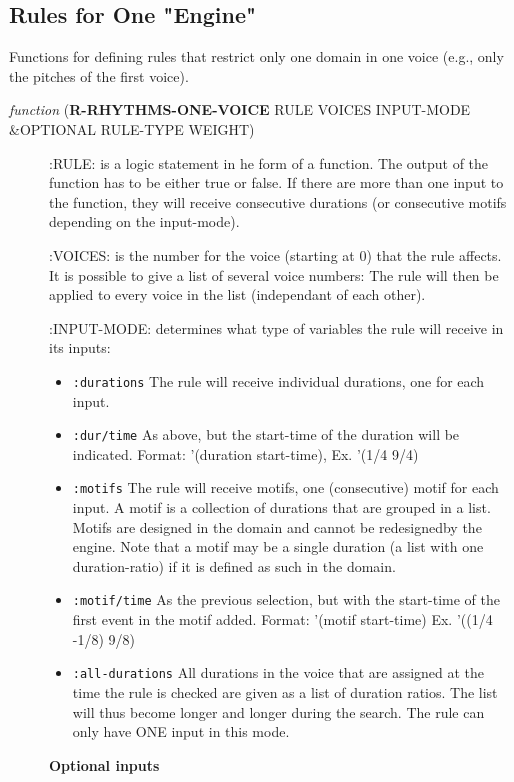 \subsection*{Rules for One "Engine"}
\label{sec:org563702e}

Functions for defining rules that restrict only one domain in one voice (e.g., only the pitches of the first voice). 


\begin{description}
\item[{ \emph{function} (\textbf{R-RHYTHMS-ONE-VOICE} RULE VOICES INPUT-MODE \&OPTIONAL RULE-TYPE WEIGHT)}] :RULE: is a logic statement in he form of a function. The output of the function has to be either true or false. If there are more than one input to the function, they will receive consecutive durations (or consecutive motifs depending on the input-mode). 

:VOICES: is the number for the voice (starting at 0) that the rule affects. It is possible to give a list of several voice numbers: The rule will then be applied to every voice in the list (independant of each other).

:INPUT-MODE: determines what type of variables the rule will receive in its inputs:
\begin{itemize}
\item \texttt{:durations} The rule will receive individual durations, one for each input.
\item \texttt{:dur/time} As above, but the start-time of the duration will be indicated.
Format: '(duration start-time), Ex. '(1/4 9/4)
\item \texttt{:motifs} The rule will receive motifs, one (consecutive) motif for each 
input. A motif is a collection of durations that are grouped in 
a list. Motifs are designed in the domain and cannot be 
redesignedby the engine. Note that a motif may be a single 
duration (a list with one duration-ratio) if it is defined as 
such in the domain.
\item \texttt{:motif/time} As the previous selection, but with the start-time of the first event in the motif added. Format: '(motif start-time)
Ex. '((1/4 -1/8) 9/8)
\item \texttt{:all-durations} All durations in the voice that are assigned at the time the rule is checked are given as a list of duration ratios. The list will thus become longer and longer during the search. The rule can only have ONE input in this mode.
\end{itemize}
\textbf{Optional inputs}


\end{description}
